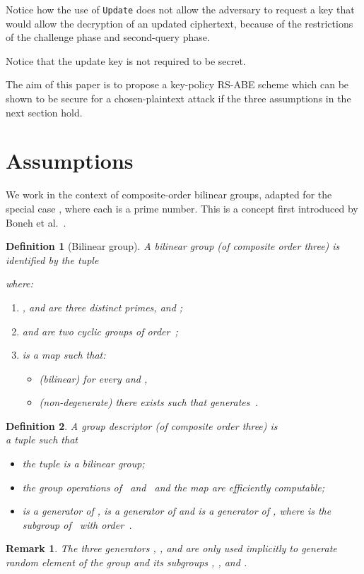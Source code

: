 \documentclass[a4paper,10pt]{article}
\newtheorem{definition}{Definition}
\newtheorem{remark}{Remark}
\newcommand{\definline}[1]{(\textit{#1})}
\newcommand{\singlefunction}[1]{\texttt{#1}}
\begin{document}
	
Notice how the use of \singlefunction{Update} does not allow the adversary to request a key that would allow the decryption of an updated ciphertext, because of the restrictions of the challenge phase and second-query phase. 
	
	Notice that the update key is not required to be secret.
	
	The aim of this paper is to propose a key-policy RS-ABE scheme which can be shown to be secure for a chosen-plaintext attack if the three assumptions in the next section hold.
	
	

	\section{Assumptions}
	\label{assumptions.sec}
	We work in the context of composite-order bilinear groups, adapted for the special case , where each  is a prime number. This is a concept first introduced by Boneh et al.~\cite{kilian2005bilineargroups}.
	\begin{definition}[Bilinear group]
		\label{bilineargroup.def}
		A \emph{bilinear group} (of composite order three) is identified by the tuple
		
		 where:
		
		\begin{enumerate}
			\item
			,  and  are three distinct primes, and ;
			\item
			 and  are two cyclic groups of order~;
			\item
			 is a map such that:
			\begin{itemize}
				\item
				\definline{bilinear} for every  and , 
				
				\item
				\definline{non-degenerate} there exists  such that  generates~.
			\end{itemize}
		\end{enumerate}
		\end{definition}
		\begin{definition}
		\label{groupdes.def}
		A \emph{group descriptor} (of composite order three) is\\ a tuple  such that
		\begin{itemize}
		\item the tuple  is a bilinear group;
		\item the group operations of~ and~ and the map  are efficiently computable;
		\item  is a generator of ,  is a generator of  and  is a generator of , where  is the subgroup of~ with order~.
		\end{itemize}
		\end{definition}
		\begin{remark}
		The three generators , , and  are only used implicitly to generate random element of the group  and its subgroups , , and .
		\end{remark}
		
\end{document}
